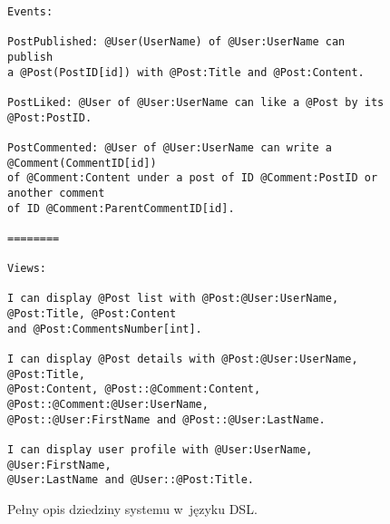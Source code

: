 \begin{figure}[!ht]
\begin{verbatim}
Events:

PostPublished: @User(UserName) of @User:UserName can publish
a @Post(PostID[id]) with @Post:Title and @Post:Content.

PostLiked: @User of @User:UserName can like a @Post by its @Post:PostID.

PostCommented: @User of @User:UserName can write a @Comment(CommentID[id])
of @Comment:Content under a post of ID @Comment:PostID or another comment
of ID @Comment:ParentCommentID[id].

========

Views:

I can display @Post list with @Post:@User:UserName, @Post:Title, @Post:Content
and @Post:CommentsNumber[int].

I can display @Post details with @Post:@User:UserName, @Post:Title,
@Post:Content, @Post::@Comment:Content, @Post::@Comment:@User:UserName,
@Post::@User:FirstName and @Post::@User:LastName.

I can display user profile with @User:UserName, @User:FirstName,
@User:LastName and @User::@Post:Title.

\end{verbatim}
\caption{
 Pełny opis dziedziny systemu w~języku DSL.
}
\label{fig:single:model_dsl}
\end{figure}
